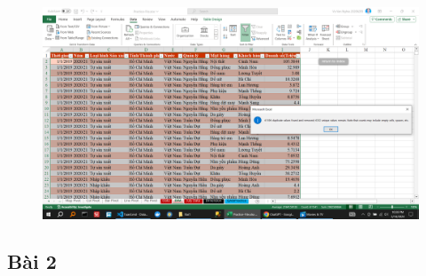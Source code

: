 \documentclass{article}
\begin{document}



\begin{figure}[H]
\centering
\includegraphics[scale = 0.15]{Bai1/ThucHanh/2.png}
\end{figure}
\subsection{Bài 2}


\end{document}
